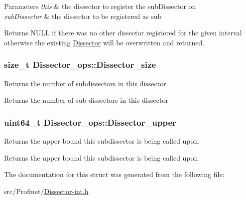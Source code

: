 \begin{DoxyParams}{Parameters}
{\em this} & the dissector to register the sub\+Dissector on \\
\hline
{\em sub\+Dissector} & the dissector to be registered as sub\\
\hline
\end{DoxyParams}
\begin{DoxyReturn}{Returns}
N\+U\+L\+L if there was no other dissector registered for the given interval otherwise the existing \hyperlink{struct_dissector}{Dissector} will be overwritten and returned. 
\end{DoxyReturn}
\hypertarget{struct_dissector__ops_a8982a0368e988bc9cb93ee83d5411b99}{}
\subsubsection[{Dissector\+\_\+size}]{\setlength{\rightskip}{0pt plus 5cm}size\+\_\+t Dissector\+\_\+ops\+::\+Dissector\+\_\+size}\label{struct_dissector__ops_a8982a0368e988bc9cb93ee83d5411b99}


Returns the number of subdissectors in this dissector. 

\begin{DoxyReturn}{Returns}
the number of sub-\/dissectors in this dissector 
\end{DoxyReturn}
\hypertarget{struct_dissector__ops_a3d9e177f508734b6136538e051b64699}{}
\subsubsection[{Dissector\+\_\+upper}]{\setlength{\rightskip}{0pt plus 5cm}uint64\+\_\+t Dissector\+\_\+ops\+::\+Dissector\+\_\+upper}\label{struct_dissector__ops_a3d9e177f508734b6136538e051b64699}


Returns the upper bound this subdissector is being called upon. 

\begin{DoxyReturn}{Returns}
the upper bound this subdissector is being called upon 
\end{DoxyReturn}


The documentation for this struct was generated from the following file\+:\begin{DoxyCompactItemize}
\item 
src/\+Profinet/\hyperlink{_dissector-int_8h}{Dissector-\/int.\+h}\end{DoxyCompactItemize}
